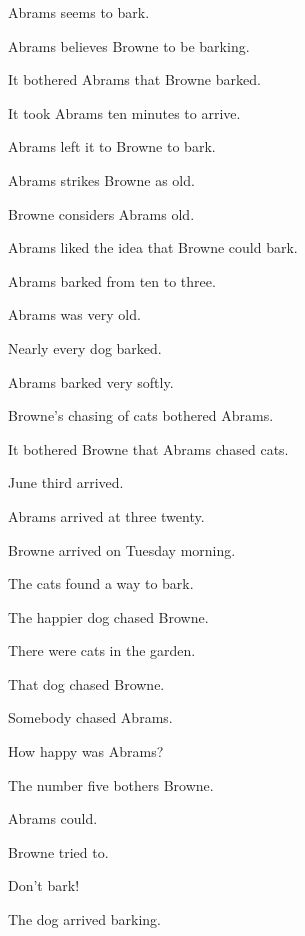 Abrams seems to bark.

Abrams believes Browne to be barking.

It bothered Abrams that Browne barked.

It took Abrams ten minutes to arrive.

Abrams left it to Browne to bark.

Abrams strikes Browne as old.

Browne considers Abrams old.

Abrams liked the idea that Browne could bark.

Abrams barked from ten to three.

Abrams was very old.

Nearly every dog barked.

Abrams barked very softly.

Browne's chasing of cats bothered Abrams.

It bothered Browne that Abrams chased cats.

June third arrived.

Abrams arrived at three twenty.

Browne arrived on Tuesday morning.

The cats found a way to bark.

The happier dog chased Browne.

There were cats in the garden.

That dog chased Browne.

Somebody chased Abrams.

How happy was Abrams?

The number five bothers Browne.

Abrams could.

Browne tried to.

Don't bark!

The dog arrived barking.
